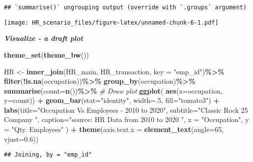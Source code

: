 \documentclass[
]{article}
\newenvironment{Shaded}{\begin{snugshade}}{\end{snugshade}}
\newcommand{\CommentTok}[1]{\textcolor[rgb]{0.56,0.35,0.01}{\textit{#1}}}
\newcommand{\DataTypeTok}[1]{\textcolor[rgb]{0.13,0.29,0.53}{#1}}
\newcommand{\DecValTok}[1]{\textcolor[rgb]{0.00,0.00,0.81}{#1}}
\newcommand{\FloatTok}[1]{\textcolor[rgb]{0.00,0.00,0.81}{#1}}
\newcommand{\KeywordTok}[1]{\textcolor[rgb]{0.13,0.29,0.53}{\textbf{#1}}}
\newcommand{\NormalTok}[1]{#1}
\newcommand{\OperatorTok}[1]{\textcolor[rgb]{0.81,0.36,0.00}{\textbf{#1}}}
\newcommand{\StringTok}[1]{\textcolor[rgb]{0.31,0.60,0.02}{#1}}
\begin{document}
\begin{verbatim}
## `summarise()` ungrouping output (override with `.groups` argument)
\end{verbatim}

\texttt{[image: HR\_scenario\_files/figure-latex/unnamed-chunk-6-1.pdf]}

\textbf{\emph{Visualize - a draft plot}}

\begin{Shaded}
\begin{Highlighting}[]
\KeywordTok{theme\_set}\NormalTok{(}\KeywordTok{theme\_bw}\NormalTok{())}

\NormalTok{HR \textless{}{-}}\StringTok{ }\KeywordTok{inner\_join}\NormalTok{(HR\_main, HR\_transaction, }\DataTypeTok{key =} \StringTok{"emp\_id"}\NormalTok{)}\OperatorTok{\%\textgreater{}\%}
\StringTok{  }\KeywordTok{filter}\NormalTok{(}\OperatorTok{!}\KeywordTok{is.na}\NormalTok{(occupation))}\OperatorTok{\%\textgreater{}\%}
\StringTok{   }\KeywordTok{group\_by}\NormalTok{(}\StringTok{\textasciigrave{}}\DataTypeTok{occupation}\StringTok{\textasciigrave{}}\NormalTok{)}\OperatorTok{\%\textgreater{}\%}
\StringTok{   }\KeywordTok{summarise}\NormalTok{(}\DataTypeTok{count=}\KeywordTok{n}\NormalTok{())}\OperatorTok{\%\textgreater{}\%}
\StringTok{   }\CommentTok{\# Draw plot}
\StringTok{  }\KeywordTok{ggplot}\NormalTok{( }\KeywordTok{aes}\NormalTok{(}\DataTypeTok{x=}\NormalTok{occupation, }\DataTypeTok{y=}\NormalTok{count)) }\OperatorTok{+}\StringTok{ }
\StringTok{  }\KeywordTok{geom\_bar}\NormalTok{(}\DataTypeTok{stat=}\StringTok{"identity"}\NormalTok{, }\DataTypeTok{width=}\NormalTok{.}\DecValTok{5}\NormalTok{, }\DataTypeTok{fill=}\StringTok{"tomato3"}\NormalTok{) }\OperatorTok{+}\StringTok{ }
\StringTok{  }\KeywordTok{labs}\NormalTok{(}\DataTypeTok{title=}\StringTok{"Occupation Vs Employees {-} 2010 to 2020"}\NormalTok{, }
       \DataTypeTok{subtitle=}\StringTok{"Classic Rock 25 Company "}\NormalTok{, }
       \DataTypeTok{caption=}\StringTok{"source: HR Data from 2010 to 2020 "}\NormalTok{,}
       \DataTypeTok{x =} \StringTok{"Occupation"}\NormalTok{, }\DataTypeTok{y =} \StringTok{"Qty. Employees"}\NormalTok{ ) }\OperatorTok{+}\StringTok{ }
\StringTok{  }\KeywordTok{theme}\NormalTok{(}\DataTypeTok{axis.text.x =} \KeywordTok{element\_text}\NormalTok{(}\DataTypeTok{angle=}\DecValTok{65}\NormalTok{, }\DataTypeTok{vjust=}\FloatTok{0.6}\NormalTok{))}
\end{Highlighting}
\end{Shaded}

\begin{verbatim}
## Joining, by = "emp_id"
\end{verbatim}
\end{document}
